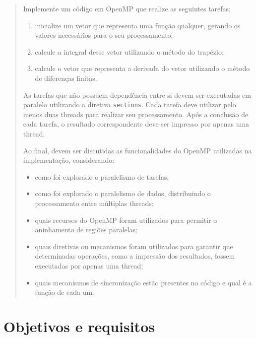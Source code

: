 \begin{quote}
Implemente um código em OpenMP que realize as seguintes tarefas:

\begin{enumerate}
    \item inicialize um vetor que representa uma função qualquer, gerando os
    valores necessários para o seu processamento;
    \item calcule a integral desse vetor utilizando o método do trapézio;
    \item calcule o vetor que representa a derivada do vetor utilizando o
    método de diferenças finitas.
\end{enumerate}

As tarefas que não possuem dependência entre si devem ser executadas em
paralelo utilizando a diretiva \texttt{sections}. Cada tarefa deve utilizar
pelo menos duas threads para realizar seu processamento. Após a conclusão de
cada tarefa, o resultado correspondente deve ser impresso por apenas uma
thread.

Ao final, devem ser discutidas as funcionalidades do OpenMP utilizadas na
implementação, considerando:

\begin{itemize}
    \item como foi explorado o paralelismo de tarefas;
    \item como foi explorado o paralelismo de dados, distribuindo o
    processamento entre múltiplas threads;
    \item quais recursos do OpenMP foram utilizados para permitir o
    aninhamento de regiões paralelas;
    \item quais diretivas ou mecanismos foram utilizados para garantir que
    determinadas operações, como a impressão dos resultados, fossem
    executadas por apenas uma thread;
    \item quais mecanismos de sincronização estão presentes no código e qual
    é a função de cada um.
\end{itemize}
\end{quote}


\section{Objetivos e requisitos}
\label{sec:atvd08-objetivos}

